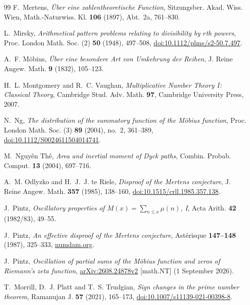 \documentclass[11pt,reqno]{amsart}
\numberwithin{equation}{section}
\theoremstyle{plain}
\theoremstyle{definition}
\theoremstyle{remark}
\begin{document}
\begin{thebibliography}{99}
F.~Mertens, \emph{\"Uber eine zahlentheoretische Function}, Sitzungsber.
Akad. Wiss. Wien, Math.-Naturwiss. Kl. \textbf{106} (1897), Abt.~2a,
761--830.

L.~Mirsky, \emph{Arithmetical pattern problems relating to divisibility by $r$th powers}, Proc. London Math. Soc. (2) \textbf{50} (1948), 497--508,
\href{https://doi.org/10.1112/plms/s2-50.7.497}{doi:10.1112/plms/s2-50.7.497}.

A.~F. M\"obius, \emph{\"Uber eine besondere Art von Umkehrung der Reihen},
J. Reine Angew. Math. \textbf{9} (1832), 105--123.

H.~L. Montgomery and R.~C. Vaughan, \emph{Multiplicative Number Theory I:
Classical Theory}, Cambridge Stud. Adv. Math. \textbf{97}, Cambridge
University Press, 2007.

N.~Ng, \emph{The distribution of the summatory function of the M\"obius
function}, Proc. London Math. Soc. (3) \textbf{89} (2004), no.~2, 361--389,
\href{https://doi.org/10.1112/S0024611504014741}{doi:10.1112/S0024611504014741}.

M.~Nguy\^en Th\^e, \emph{Area and inertial moment of Dyck paths}, Combin.
Probab. Comput. \textbf{13} (2004), 697--716.

A.~M. Odlyzko and H.~J.~J. te Riele, \emph{Disproof of the Mertens
conjecture}, J. Reine Angew. Math. \textbf{357} (1985), 138--160,
\href{https://doi.org/10.1515/crll.1985.357.138}{doi:10.1515/crll.1985.357.138}.

J.~Pintz, \emph{Oscillatory properties of $M(x)=\sum_{n\le x}\mu(n)$, I},
Acta Arith. \textbf{42} (1982/83), 49--55.

J.~Pintz, \emph{An effective disproof of the Mertens conjecture}, Ast\'erisque
\textbf{147--148} (1987), 325--333,
\href{https://www.numdam.org/article/AST_1987__147-148__325_0.pdf}{numdam.org}.

J.~Pintz, \emph{Oscillation of partial sums of the M\"obius function and
zeros of Riemann's zeta function}, \href{https://arxiv.org/abs/2608.24878v2}{arXiv:2608.24878v2} [math.NT] (1 September 2026).

T.~Morrill, D.~J. Platt and T.~S. Trudgian,
\emph{Sign changes in the prime number theorem},
Ramanujan J. \textbf{57} (2021), 165--173,
\href{https://doi.org/10.1007/s11139-021-00398-8}{doi:10.1007/s11139-021-00398-8}.


\end{thebibliography}
\end{document}
